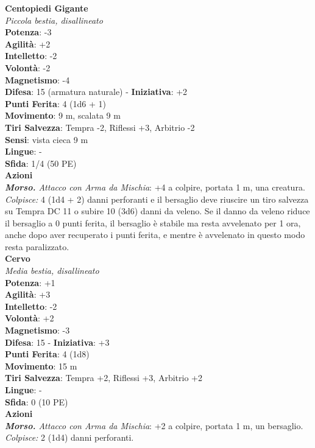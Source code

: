 \begin{multicols}{2}
\medskip\textbf{Centopiedi Gigante}\\
\emph{Piccola bestia, disallineato}\\
\textbf{Potenza}: -3\\
\textbf{Agilità}: +2\\
\textbf{Intelletto}: -2\\
\textbf{Volontà}: -2\\
\textbf{Magnetismo}: -4\\
\textbf{Difesa}: 15 (armatura naturale) - \textbf{Iniziativa}: +2\\
\textbf{Punti Ferita}: 4 (1d6 + 1)\\
\textbf{Movimento}: 9 m, scalata 9 m\\
\textbf{Tiri Salvezza}: Tempra -2, Riflessi +3, Arbitrio -2 \\
\textbf{Sensi}: vista cieca 9 m\\
\textbf{Lingue}: -\\
\textbf{Sfida}: 1/4 (50 PE)\smallskip\\
\smallskip\textbf{Azioni}\\
\emph{\textbf{Morso.} Attacco con Arma da Mischia}: +4 a colpire, portata 1 m, una creatura.\\
\emph{Colpisce:} 4 (1d4 + 2) danni perforanti e il bersaglio deve riuscire un tiro salvezza su Tempra DC 11 o subire 10 (3d6) danni da veleno. Se il danno da veleno riduce il bersaglio a 0 punti ferita, il bersaglio è stabile ma resta avvelenato per 1 ora, anche dopo aver recuperato i punti ferita, e mentre è avvelenato in questo modo resta paralizzato.\\

\medskip\textbf{Cervo}\\
\emph{Media bestia, disallineato}\\
\textbf{Potenza}: +1\\
\textbf{Agilità}: +3\\
\textbf{Intelletto}: -2\\
\textbf{Volontà}: +2\\
\textbf{Magnetismo}: -3\\
\textbf{Difesa}: 15 - \textbf{Iniziativa}: +3\\
\textbf{Punti Ferita}: 4 (1d8)\\
\textbf{Movimento}: 15 m\\
\textbf{Tiri Salvezza}: Tempra +2, Riflessi +3, Arbitrio +2 \\
\textbf{Lingue}: -\\
\textbf{Sfida}: 0 (10 PE)\smallskip\\
\smallskip\textbf{Azioni}\\
\emph{\textbf{Morso.} Attacco con Arma da Mischia}: +2 a colpire, portata 1 m, un bersaglio.\\
\emph{Colpisce:} 2 (1d4) danni perforanti.\\


\end{multicols}
